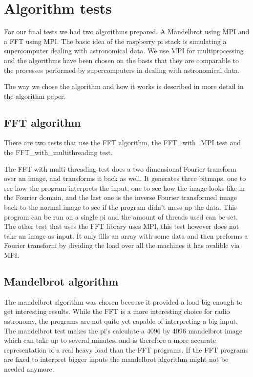 \documentclass{article}
\begin{document}




\section{Algorithm tests}

For our final tests we had two algorithms prepared. A Mandelbrot using MPI and a FFT using MPI. The basic idea of the raspberry pi stack is simulating a supercomputer dealing with astronomical data. We use MPI for multiprocessing and the algorithms have been chosen on the basis that they are comparable to the processes performed by supercomputers in dealing with astronomical data.

The way we chose the algorithm and how it works is described in more detail in the algorithm paper.

\subsection{FFT algorithm}

There are two tests that use the FFT algorithm, the FFT\_with\_MPI test and the FFT\_with\_multithreading test.\par The FFT with multi threading test does a two dimensional Fourier transform over an image, and transforms it back as well. It generates three bitmaps, one to see how the program interprets the input, one to see how the image looks like in the Fourier domain, and the last one is the inverse Fourier transformed image back to the normal image to see if the program didn't mess up the data. This program can be run on a single pi and the amount of threads used can be set.\\

The other test that uses the FFT library uses MPI, this test however does not take an image as input. It only fills an array with some data and then preforms a Fourier transform by dividing the load over all the machines it has avalible via MPI. 

\subsection{Mandelbrot algorithm}
The mandelbrot algorithm was chosen because it provided a load big enough to get interesting results. While the FFT is a more interesting choice for radio astronomy, the programs are not quite yet capable of interpreting a big input. The mandelbrot test makes the pi's calculate a 4096 by 4096 mandelbrot image which can take up to several minutes, and is therefore a more accurate representation of a real heavy load than the FFT programs. If the FFT programs are fixed to interpret bigger inputs the mandelbrot algorithm might not be needed anymore.   
\end{document}
